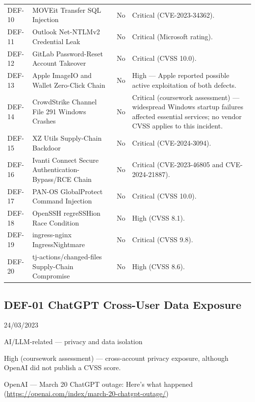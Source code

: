 \begin{longtable}{p{}p{}p{}p{}}
DEF-10 & MOVEit Transfer SQL Injection & No & Critical (CVE-2023-34362). \\

DEF-11 & Outlook Net-NTLMv2 Credential Leak & No & Critical (Microsoft rating). \\

DEF-12 & GitLab Password-Reset Account Takeover & No & Critical (CVSS 10.0). \\

DEF-13 & Apple ImageIO and Wallet Zero-Click Chain & No & High — Apple reported possible active exploitation of both defects. \\

DEF-14 & CrowdStrike Channel File 291 Windows Crashes & No & Critical (coursework assessment) — widespread Windows startup failures affected essential services; no vendor CVSS applies to this incident. \\

DEF-15 & XZ Utils Supply-Chain Backdoor & No & Critical (CVE-2024-3094). \\

DEF-16 & Ivanti Connect Secure Authentication-Bypass/RCE Chain & No & Critical (CVE-2023-46805 and CVE-2024-21887). \\

DEF-17 & PAN-OS GlobalProtect Command Injection & No & Critical (CVSS 10.0). \\

DEF-18 & OpenSSH regreSSHion Race Condition & No & High (CVSS 8.1). \\

DEF-19 & ingress-nginx IngressNightmare & No & Critical (CVSS 9.8). \\

DEF-20 & tj-actions/changed-files Supply-Chain Compromise & No & High (CVSS 8.6). \\

\bottomrule\end{longtable}

\subsection{DEF-01 ChatGPT Cross-User Data Exposure}

\begin{description}[style=nextline,leftmargin=3.2cm]

\item[Publicized] 24/03/2023

\item[Category] AI/LLM-related — privacy and data isolation

\item[Severity] High (coursework assessment) — cross-account privacy exposure, although OpenAI did not publish a CVSS score.

\item[Source] OpenAI — March 20 ChatGPT outage: Here's what happened (\url{https://openai.com/index/march-20-chatgpt-outage/})

\end{description}

